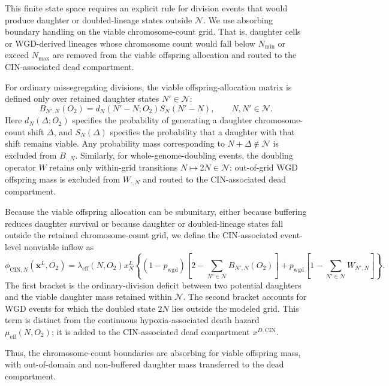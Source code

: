 \documentclass[11pt]{article}
\begin{document}
This finite state space requires an explicit rule for division events that would produce daughter or doubled-lineage states outside $\mathcal{N}$. We use absorbing boundary handling on the viable chromosome-count grid. That is, daughter cells or WGD-derived lineages whose chromosome count would fall below $N_{\min}$ or exceed $N_{\max}$ are removed from the viable offspring allocation and routed to the CIN-associated dead compartment.

For ordinary missegregating divisions, the viable offspring-allocation matrix is defined only over retained daughter states $N'\in\mathcal{N}$:
\[
B_{N',N}(O_2) = d_N(N'-N;O_2)S_N(N'-N), \qquad N,N'\in\mathcal{N}.
\]
Here $d_N(\Delta;O_2)$ specifies the probability of generating a daughter chromosome-count shift $\Delta$, and $S_N(\Delta)$ specifies the probability that a daughter with that shift remains viable. Any probability mass corresponding to $N+\Delta\notin\mathcal{N}$ is excluded from $B_{\cdot,N}$. Similarly, for whole-genome-doubling events, the doubling operator $W$ retains only within-grid transitions $N\mapsto 2N\in\mathcal{N}$; out-of-grid WGD offspring mass is excluded from $W_{\cdot,N}$ and routed to the CIN-associated dead compartment.


Because the viable offspring allocation can be subunitary, either because buffering reduces daughter survival or because daughter or doubled-lineage states fall outside the retained chromosome-count grid, we define the CIN-associated event-level nonviable inflow as
\begin{equation}
\phi_{\mathrm{CIN},N}(\mathbf{x}^L,O_2) = \lambda_{\mathrm{eff}}(N,O_2)x^L_N
\left\{
(1-p_{\mathrm{wgd}})
\left[
2-\sum_{N'\in\mathcal{N}}B_{N',N}(O_2)
\right]
+
p_{\mathrm{wgd}}
\left[
1-\sum_{N'\in\mathcal{N}}W_{N',N}
\right]
\right\}.
\label{eq:appendix_phi_CIN}
\end{equation}
The first bracket is the ordinary-division deficit between two potential daughters and the viable daughter mass retained within $\mathcal{N}$. The second bracket accounts for WGD events for which the doubled state $2N$ lies outside the modeled grid. This term is distinct from the continuous hypoxia-associated death hazard $\mu_{\mathrm{eff}}(N,O_2)$; it is added to the CIN-associated dead compartment $x^{D,\mathrm{CIN}}$.

Thus, the chromosome-count boundaries are absorbing for viable offspring mass, with out-of-domain and non-buffered daughter mass transferred to the dead compartment.
\end{document}
